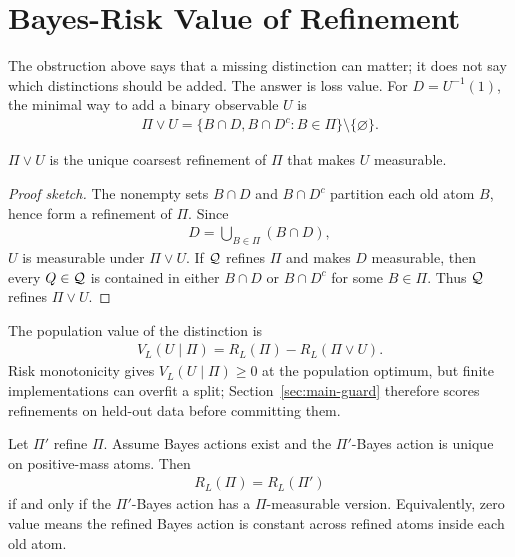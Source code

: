 \section{Bayes-Risk Value of Refinement}
\label{sec:main-value}

The obstruction above says that a missing distinction can matter; it does not say which distinctions should be added. The answer is loss value. For $D=U^{-1}(1)$, the minimal way to add a binary observable $U$ is
\begin{align*}
\Pi\vee U
=
\{B\cap D,B\cap D^c:B\in\Pi\}\setminus\{\varnothing\}.
\end{align*}

\begin{proposition}
\label{prop:main-minimal-join}
$\Pi\vee U$ is the unique coarsest refinement of $\Pi$ that makes $U$ measurable.
\end{proposition}

\begin{proof}[Proof sketch]
The nonempty sets $B\cap D$ and $B\cap D^c$ partition each old atom $B$, hence form a refinement of $\Pi$. Since
\begin{align*}
D=\bigcup_{B\in\Pi}(B\cap D),
\end{align*}
$U$ is measurable under $\Pi\vee U$. If $\mathcal{Q}$ refines $\Pi$ and makes $D$ measurable, then every $Q\in\mathcal{Q}$ is contained in either $B\cap D$ or $B\cap D^c$ for some $B\in\Pi$. Thus $\mathcal{Q}$ refines $\Pi\vee U$.
\end{proof}

The population value of the distinction is
\begin{align*}
V_L(U\mid\Pi)=R_L(\Pi)-R_L(\Pi\vee U).
\end{align*}
Risk monotonicity gives $V_L(U\mid\Pi)\ge0$ at the population optimum, but finite implementations can overfit a split; Section~\ref{sec:main-guard} therefore scores refinements on held-out data before committing them.

\begin{theorem}
\label{thm:main-loss-relevant}
Let $\Pi'$ refine $\Pi$. Assume Bayes actions exist and the $\Pi'$-Bayes action is unique on positive-mass atoms. Then
\begin{align*}
R_L(\Pi)=R_L(\Pi')
\end{align*}
if and only if the $\Pi'$-Bayes action has a $\Pi$-measurable version. Equivalently, zero value means the refined Bayes action is constant across refined atoms inside each old atom.
\end{theorem}

